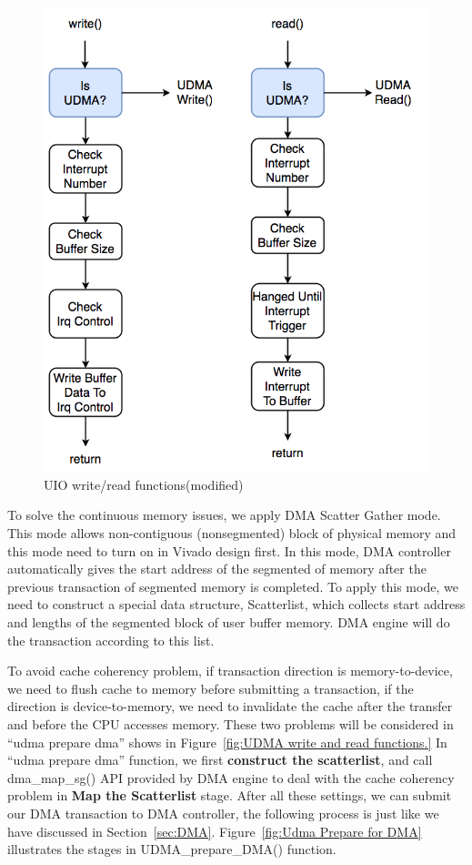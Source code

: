 \begin{figure}[!htb]
  \centering
  \includegraphics[scale=0.5]{images/udma_func_entry.png}
  \caption[UIO write/read functions(modified)]{UIO write/read functions(modified)}
  \label{fig:UIO write and read functions(modified)}
\end{figure}


\newpage
To solve the continuous memory issues, we apply DMA Scatter Gather mode. This mode allows non-contiguous (nonsegmented) block of physical memory and this mode need to turn on in Vivado 
design first. In this mode, DMA controller automatically gives the start address of the 
segmented of memory after the previous transaction of segmented memory is completed. To 
apply this mode, we need to construct a special data structure, Scatterlist, which collects 
start address and lengths of the segmented block of user buffer memory. DMA engine will do the
transaction according to this list. 

To avoid cache coherency problem, if transaction direction is memory-to-device, we need to flush 
cache to memory before submitting a transaction, if the direction is device-to-memory, we need to invalidate 
the cache after the transfer and before the CPU accesses memory. 
{}
These two problems will be considered in ``udma prepare dma'' shows in Figure~\ref{fig:UDMA write and read functions.}
In ``udma prepare dma'' function, we first \textbf{construct the scatterlist}, and call dma\_map\_sg() API provided by DMA engine to deal with the cache coherency problem in \textbf{Map the Scatterlist} stage. After all these settings, we can submit our DMA transaction to DMA controller, the following process is just like we have discussed in Section~\ref{sec:DMA}. Figure~\ref{fig:Udma Prepare for DMA} illustrates the stages in UDMA\_prepare\_DMA() function.

